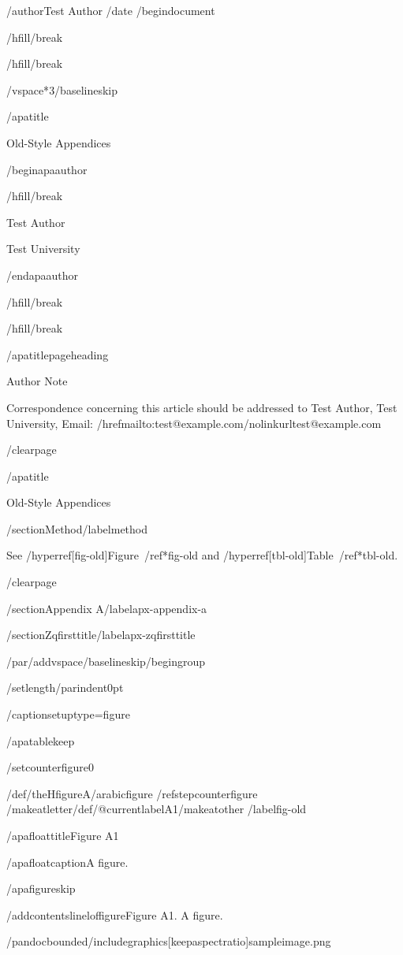 /author{Test Author}
/date{}
/begin{document}


/hfill/break

/hfill/break

/vspace*{3/baselineskip}

/apatitle{

Old-Style Appendices

}

/begin{apaauthor}

/hfill/break

Test Author

Test University

/end{apaauthor}

/hfill/break

/hfill/break

/apatitlepageheading{

Author Note

}

Correspondence concerning this article should be addressed to Test
Author, Test University, Email:
/href{mailto:test@example.com}{/nolinkurl{test@example.com}}

/clearpage

/apatitle{

Old-Style Appendices

}

/section{Method}/label{method}

See /hyperref[fig-old]{Figure~/ref*{fig-old}} and
/hyperref[tbl-old]{Table~/ref*{tbl-old}}.

/clearpage

/section{Appendix A}/label{apx-appendix-a}

/section{Zqfirsttitle}/label{apx-zqfirsttitle}

/par/addvspace{/baselineskip}/begingroup

/setlength{/parindent}{0pt}

/captionsetup{type=figure}

/apatablekeep

/setcounter{figure}{0}

/def/theHfigure{A/arabic{figure}}%
/refstepcounter{figure}%
/makeatletter/def/@currentlabel{A1}/makeatother%
/label{fig-old}

/apafloattitle{Figure A1}

/apafloatcaption{A figure.}

/apafigureskip

/addcontentsline{lof}{figure}{Figure A1. A figure.}

/pandocbounded{/includegraphics[keepaspectratio]{sampleimage.png}}

